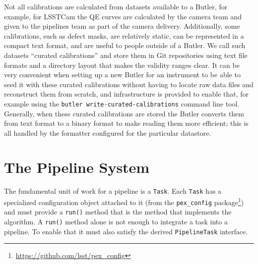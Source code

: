 \documentclass[]{spie}
\begin{document}
Not all calibrations are calculated from datasets available to a Butler, for example, for LSSTCam the QE curves are calculated by the camera team and given to the pipelines team as part of the camera delivery.
Additionally, some calibrations, such as defect masks, are relatively static, can be represented in a compact text format, and are useful to people outside of a Butler.
We call such datasets ``curated calibrations'' and store them in Git repositories using text file formats and a directory layout that makes the validity ranges clear.
It can be very convenient when setting up a new Butler for an instrument to be able to seed it with these curated calibrations without having to locate raw data files and reconstruct them from scratch, and infrastructure is provided to enable that, for example using the \texttt{butler write-curated-calibrations} command line tool.
Generally, when these curated calibrations are stored the Butler converts them from text format to a binary format to make reading them more efficient; this is all handled by the formatter configured for the particular datastore.

\section{The Pipeline System}

\setcounter{footnote}{0}  %

The fundamental unit of work for a pipeline is a \texttt{Task}.
Each \texttt{Task} has a specialized configuration object attached to it (from the \texttt{pex\_config} package\footnote{\url{https://github.com/lsst/pex_config}}) and must provide a \texttt{run()} method that is the method that implements the algorithm.
A \texttt{run()} method alone is not enough to integrate a task into a pipeline.
To enable that it must also satisfy the derived \texttt{PipelineTask} interface.
\end{document}
